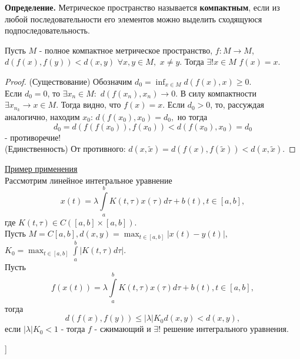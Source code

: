 \textbf{Определение.} Метрическое пространство называется \textbf{компактным}, если из любой последовательности его элементов можно выделить сходящуюся подпоследовательность.

\begin{theorem}
Пусть $M$ - полное компактное метрическое пространство, $f:M \rightarrow M$, $d(f(x), f(y)) < d(x, y)$ $\forall x, y \in M,$ $x \neq y.$ Тогда $\exists!x \in M$ $f(x)=x$.
\end{theorem}
\begin{proof}
    (Существование) Обозначим $d_0=\inf_{x \in M}{d(f(x), x)} \geq 0.$ \\
    Если $d_0 = 0$, то $\exists x_n \in M:$ $d(f(x_n), x_n) \rightarrow 0.$ В силу компактности $\exists x_{n_k} \rightarrow x \in M$. Тогда видно, что $f(x)=x$.
    Если $d_0 > 0$, то, рассуждая аналогично, находим $x_0$: $d(f(x_0), x_0)=d_0,$ но тогда
    \begin{equation*}
        d_0 = d(f(f(x_0)), f(x_0)) < d(f(x_0), x_0) = d_0
    \end{equation*}
    - противоречие! \\
    (Единственность) От противного: $d(x, \tilde{x})=d(f(x),f(\tilde{x})) < d(x, \tilde{x}).$
\end{proof}

{\large \underline{Пример применения}} \\
Рассмотрим линейное интегральное уравнение
\begin{equation*}
    x(t) = \lambda \int\limits_a^b K(t, \tau)x(\tau)d\tau + b(t), t \in [a,b],
\end{equation*}
где $K(t, \tau) \in C([a,b] \times [a,b]).$ \\
Пусть $M=C[a,b], d(x,y) = \max_{t \in [a,b]}|x(t)-y(t)|,$ $ K_0 = \max_{t \in [a,b]} \int\limits_a^b|K(t,\tau)d\tau|.$ \\
Пусть
\begin{equation*}
    f(x(t)) = \lambda \int\limits_a^b K(t, \tau)x(\tau)d\tau + b(t), t \in [a,b],
\end{equation*}
тогда
\begin{equation*}
    d(f(x), f(y)) \leq |\lambda|K_0d(x,y) < d(x,y),
\end{equation*}
если $|\lambda|K_0 < 1$ - тогда $f$ - сжимающий и $\exists!$ решение интегрального уравнения.

\bigbreak
[\cite[page 49-52]{funcan_autumn}]
